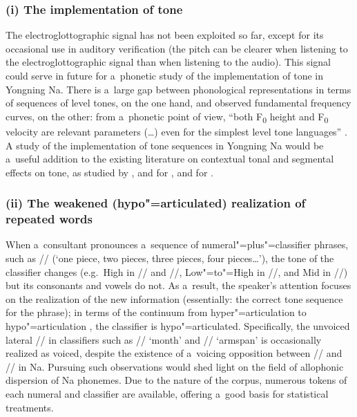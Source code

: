 \subsubsection*{(i) The implementation of tone}
The electroglottographic signal has not been exploited so
	far, except for its occasional use in auditory verification (the pitch can be clearer when
	listening to the electroglottographic signal than when listening to the audio). This signal could
	serve in future for a~phonetic study of the implementation of tone in Yongning Na. There is
	a~large gap between phonological representations in terms of sequences of level tones, on the one
	hand, and observed fundamental frequency curves, on the other: from a~phonetic point of view, “both F\textsubscript{0} height and F\textsubscript{0} velocity are
	relevant parameters ({\dots}) even for the simplest level tone languages” \citep[1]{Yu2010}. A
	study of the implementation of tone sequences in Yongning Na would be a~useful addition to the existing
	literature on contextual tonal  and segmental effects on tone, as studied by \citet{abramson1979a}, \citet{gsell1985} and \citet{gandouretal1992} for
	, and \citet{xu1997,xu1998} for .

\subsubsection*{(ii) The weakened (hypo"=articulated) realization of repeated words}
\largerpage[2]
When a~consultant
	pronounces a~sequence of {numeral}"=plus"=classifier phrases, such as // (‘one piece, two pieces, three pieces, four pieces{\dots}’), the tone
	of the classifier changes (e.g.~High in // and //, Low"=to"=High in //, and Mid in //) but its consonants and vowels do
	not. As a~result, the speaker’s attention focuses on the realization of the new information
	(essentially: the correct tone sequence for the phrase); in terms of the continuum from
	hyper"=articulation to hypo"=articulation \citep{lindblom1990}, the classifier is
	hypo"=articulated. Specifically, the unvoiced lateral // in classifiers such as //
	‘month’ and // ‘armspan’ is occasionally realized as voiced, despite the existence of
	a~voicing opposition between // and // in Na. Pursuing such observations would shed
	light on the field of allophonic dispersion of Na phonemes. Due to the nature of the corpus,
	numerous tokens of each {numeral} and classifier are available, offering a~good basis for
	statistical treatments.

